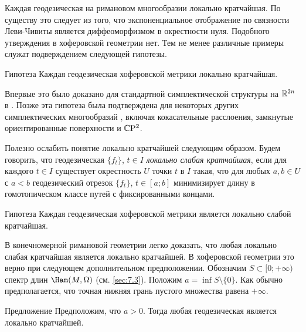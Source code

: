 Каждая геодезическая на римановом многообразии локально кратчайшая.
По существу это следует из того, что экспоненциальное отображение по
связности Леви-Чивиты является диффеоморфизмом в окрестности нуля. 
Подобного утверждения в хоферовской геометрии нет.
Тем не менее различные примеры служат подверждением следующей гипотезы.

\begin{thm}{Гипотеза}\label{12.6.A}
Каждая геодезическая хоферовской метрики локально кратчайшая.
\end{thm}

Впервые это было доказано для стандартной симплектической структуры на
$\mathbb{R}^{2n}$ в \cite{BP1}. 
Позже эта гипотеза была подтверждена для некоторых других
симплектических многообразий \cite{LM2}, включая
кокасательные расслоения, замкнутые ориентированные поверхности и
$\mathbb{C}\mathrm{P}^2$. 

Полезно ослабить понятие локально кратчайшей следующим образом.
Будем говорить, что геодезическая $\{f_t\}$, $t\in I$ \emph{локально слабая кратчайшая}, если для
каждого $t\in I$ существует окрестность $U$ точки $t$ в $I$ такая, что
для любых $a, b\in U$ с $a < b$ геодезический отрезок $\{f_t\}$, $t\in
[a;b]$ минимизирует длину в гомотопическом классе путей с
фиксированными концами. 

\begin{thm}{Гипотеза}\label{12.6.B}
Каждая геодезическая хоферовской метрики является локально слабой кратчайшая.
\end{thm}

В конечномерной римановой геометрии легко доказать, что любая локально
слабая кратчайшая является локально кратчайшей. 
В хоферовской геометрии это верно при следующем дополнительном предположении.
Обозначим $S \subset [0; +\infty)$ спектр длин $\Ham(M, \Omega)$ (см. \ref{sec:7.3}). 
Положим $a = \inf S\setminus\{0\}$.
Как обычно предполагается, что точная нижняя грань пустого множества
равена $+\infty$. 

\begin{thm}[(\cite{LM2})]{Предложение}\label{12.6.C}
Предположим, что $a>0$.
Тогда любая геодезическая является локально кратчайшей.
\end{thm}

